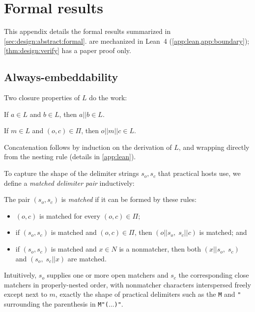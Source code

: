 \section{Formal results}
\label{app:formal}

This appendix details the formal results summarized in
\cref{sec:design:abstract:formal}.
are mechanized in Lean~4 (\cref{app:lean,app:boundary});
\cref{thm:design:verify} has a paper proof only.

\subsection{Always-embeddability}
\label{app:formal:embed}

Two closure properties of $L$ do the work:

\begin{lemma}
\label{lem:design:concat}
If $a \in L$ and $b \in L$, then $a || b \in L$.
\end{lemma}

\begin{lemma}[Wrapping]
\label{lem:design:wrap}
If $m \in L$ and $(o,c) \in \Pi$, then $o||m||c \in L$.
\end{lemma}

Concatenation follows by induction on the derivation of $L$,
and wrapping directly from the nesting rule (details in \cref{app:lean}).

To capture the shape of the delimiter strings $s_o,s_c$
that practical hosts use,
we define a \emph{matched delimiter pair} inductively:

\begin{definition}
\label{def:design:delim}
The pair $(s_o,s_c)$ is \emph{matched} if it can be formed by these rules:
\begin{itemize}
\item	$(o,c)$ is matched for every $(o,c) \in \Pi$;
\item	if $(s_o,s_c)$ is matched and $(o,c) \in \Pi$,
	then $(o||s_o,\; s_c||c)$ is matched; and
\item	if $(s_o,s_c)$ is matched and $x \in N$ is a nonmatcher,
	then both $(x||s_o,\;s_c)$ and $(s_o,\;s_c||x)$ are matched.
\end{itemize}
\end{definition}

Intuitively, $s_o$ supplies one or more open matchers
and $s_c$ the corresponding close matchers in properly-nested order,
with nonmatcher characters interspersed freely except next to $m$,
exactly the shape of practical delimiters such as
the \texttt{M} and \texttt{"} surrounding the parenthesis
in \verb|M"(|$\dots$\verb|)"|.


